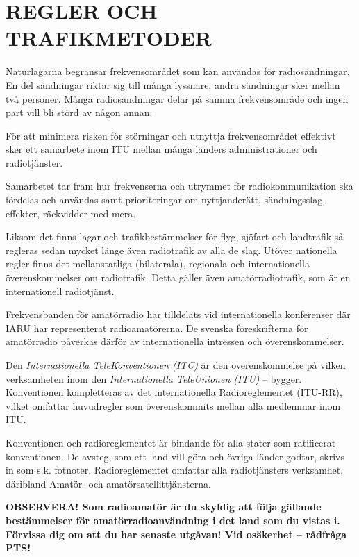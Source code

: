 \chapter{REGLER OCH TRAFIKMETODER}

Naturlagarna begränsar frekvensområdet som kan användas för radiosändningar.
En del sändningar riktar sig till många lyssnare, andra sändningar sker
mellan två personer. Många radiosändningar delar på samma frekvensområde och
ingen part vill bli störd av någon annan.

För att minimera risken för störningar och utnyttja frekvensområdet effektivt
sker ett samarbete inom ITU mellan många länders administrationer och
radiotjänster.

Samarbetet tar fram hur frekvenserna och utrymmet för radiokommunikation ska
fördelas och användas samt prioriteringar om nyttjanderätt, sändningsslag,
effekter, räckvidder med mera.

Liksom det finns lagar och trafikbestämmelser för flyg, sjöfart och landtrafik
så regleras sedan mycket länge även radiotrafik av alla de slag. Utöver
nationella regler finns det mellanstatliga (bilaterala), regionala och
internationella överenskommelser om radiotrafik. Detta gäller även
amatörradiotrafik, som är en internationell radiotjänst.

Frekvensbanden för amatörradio har tilldelats vid internationella konferenser
där IARU har representerat radioamatörerna. De svenska föreskrifterna för
amatörradio påverkas därför av internationella intressen och överenskommelser.

Den \emph{Internationella TeleKonventionen (ITC)} är den
överenskommelse på vilken verksamheten inom den \emph{Internationella
TeleUnionen (ITU)} -- bygger. Konventionen kompletteras av det internationella
Radioreglementet (ITU-RR), vilket omfattar huvudregler som överenskommits mellan
alla medlemmar inom ITU.

Konventionen och radioreglementet är bindande för alla stater som ratificerat
konventionen. De avsteg, som ett land vill göra och övriga länder godtar,
skrivs in som s.k. fotnoter. Radioreglementet omfattar alla radiotjänsters
verksamhet, däribland Amatör- och amatörsatellittjänsterna.

\textbf{OBSERVERA!  Som radioamatör är du skyldig att följa gällande
  bestämmelser för amatörradioanvändning i det land som du vistas i.
  Förvissa dig om att du har senaste utgåvan!  Vid osäkerhet --
  rådfråga PTS!}
